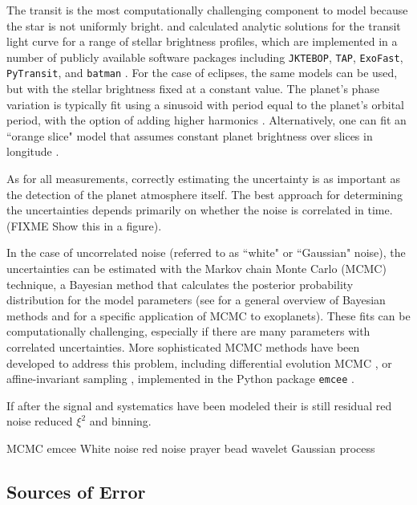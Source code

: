 \documentclass[graybox,natbib,nosecnum]{svmult}
\begin{document}
The transit is the most computationally challenging component to model because the star is not uniformly bright. \cite{mandel02} and \cite{gimenez06} calculated analytic solutions for the transit light curve for a range of stellar brightness profiles,  which are implemented in a number of publicly available software packages including \texttt{JKTEBOP}, \texttt{TAP}, \texttt{ExoFast}, \texttt{PyTransit}, and \texttt{batman} \citep{southworth04, gazak12, eastman13, parviainen15, kreidberg15a}. For the case of eclipses, the same models can be used, but with the stellar brightness fixed at a constant value.  The planet's phase variation is typically fit using a sinusoid with period equal to the planet's orbital period, with the option of adding higher harmonics \citep[e.g.][]{knutson12, stevenson16}. Alternatively, one can fit an ``orange slice" model that assumes constant planet brightness over slices in longitude \citep{knutson07, cowan08}. 

As for all measurements, correctly estimating the uncertainty is as important as the detection of the planet atmosphere itself.  The best approach for determining the uncertainties depends primarily on whether the noise is correlated in time.  (FIXME Show this in a figure). 

In the case of uncorrelated noise (referred to as ``white" or ``Gaussian" noise), the uncertainties can be estimated with the Markov chain Monte Carlo (MCMC) technique, a Bayesian method that calculates the posterior probability distribution for the model parameters (see \citealt{sivia96} for a general overview of Bayesian methods and \citealt{ford05} for a specific application of MCMC to exoplanets). These fits can be computationally challenging, especially if there are many parameters with correlated uncertainties. More sophisticated MCMC methods have been developed to address this problem, including differential evolution MCMC \citep{}, or affine-invariant sampling \citep{goodman}, implemented in the Python package \texttt{emcee} \citep{foremanmackey13}.

If after the signal and systematics have been modeled their is still residual red noise 
reduced $\xi^2$ and binning.

MCMC
emcee
White noise
red noise
	prayer bead
	wavelet
	Gaussian process

\subsection{Sources of Error}
\end{document}
